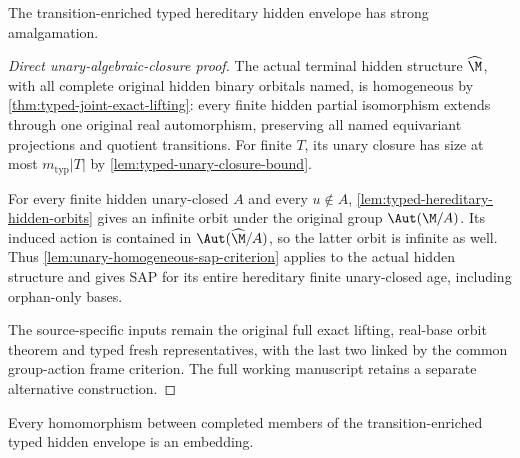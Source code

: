 \begin{theorem}
\label{thm:typed-hidden-sap}
The transition-enriched typed hereditary hidden envelope has strong
amalgamation.
\end{theorem}

\begin{proof}[Direct unary-algebraic-closure proof]
The actual terminal hidden structure $\widehat\M$, with all complete
original hidden binary orbitals named, is homogeneous by
\cref{thm:typed-joint-exact-lifting}: every finite hidden partial
isomorphism extends through one original real automorphism, preserving
all named equivariant projections and quotient transitions.
For finite $T$, its unary closure has size at most
$m_{\mathrm{typ}}|T|$ by \cref{lem:typed-unary-closure-bound}.

For every finite hidden unary-closed $A$ and every $u\notin A$,
\cref{lem:typed-hereditary-hidden-orbits} gives an infinite orbit under
the original group $\Aut(\M/A)$. Its induced action is contained in
$\Aut(\widehat\M/A)$, so the latter orbit is infinite as well.
Thus \cref{lem:unary-homogeneous-sap-criterion} applies to the
actual hidden structure and gives SAP for its entire hereditary
finite unary-closed age, including orphan-only bases.

The source-specific inputs remain the original full exact lifting,
real-base orbit theorem and typed fresh representatives, with the
last two linked by the common group-action frame criterion.
The full working manuscript retains a separate alternative construction.
\end{proof}



\begin{lemma}
\label{lem:typed-hidden-rigidity}
Every homomorphism between completed members of the transition-enriched typed
hidden envelope is an embedding.
\end{lemma}


